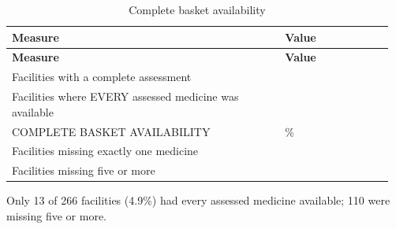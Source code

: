 \documentclass[10pt,a4paper]{report}
\begin{document}
{\footnotesize\setlength{\tabcolsep}{3pt}\renewcommand{\arraystretch}{1.15}
\begin{longtable}{>{\raggedright\arraybackslash}p{0.686\linewidth}>{\raggedright\arraybackslash}p{0.274\linewidth}}
\caption{Complete basket availability}\\
\rowcolor{navy}\textbf{\color{white}Measure} & \textbf{\color{white}Value} \\
\endfirsthead
\rowcolor{navy}\textbf{\color{white}Measure} & \textbf{\color{white}Value} \\
\endhead
Facilities with a complete assessment & 266 \\
\rowcolor{band}Facilities where EVERY assessed medicine was available & 13 \\
COMPLETE BASKET AVAILABILITY & 4.9\% \\
\rowcolor{band}Facilities missing exactly one medicine & 25 \\
Facilities missing five or more & 110 \\
\end{longtable}}
Only 13 of 266 facilities (4.9\%) had every assessed medicine available; 110 were missing five or more.
\end{document}
